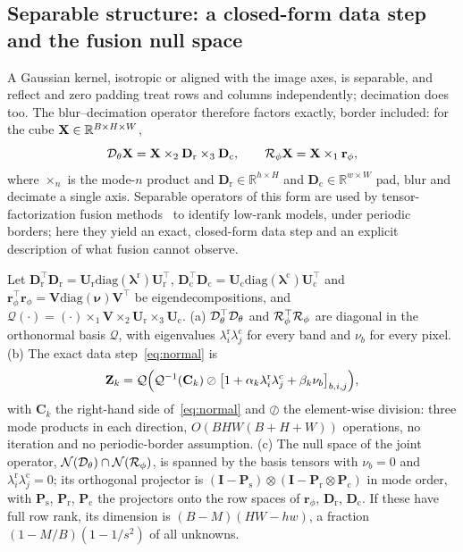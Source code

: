 \documentclass[journal]{IEEEtran}
\begin{document}
\subsection{Separable structure: a closed-form data step and the fusion null space}
\label{sec:kron}
A Gaussian kernel, isotropic or aligned with the image axes, is separable, and reflect and zero padding treat rows and columns independently; decimation does too. The blur--decimation operator therefore factors exactly, border included: for the cube $\mathbf{X}\in\mathbb{R}^{B\times H\times W}$,
\begin{equation}
\mathcal{D}_\theta\mathbf{X}=\mathbf{X}\times_2\mathbf{D}_{\mathrm{r}}\times_3\mathbf{D}_{\mathrm{c}},\qquad \mathcal{R}_\phi\mathbf{X}=\mathbf{X}\times_1\mathbf{r}_\phi,
\label{eq:modes}
\end{equation}
where $\times_n$ is the mode-$n$ product and $\mathbf{D}_{\mathrm{r}}\in\mathbb{R}^{h\times H}$ and $\mathbf{D}_{\mathrm{c}}\in\mathbb{R}^{w\times W}$ pad, blur and decimate a single axis. Separable operators of this form are used by tensor-factorization fusion methods~\cite{kanatsoulis2018stereo} to identify low-rank models, under periodic borders; here they yield an exact, closed-form data step and an explicit description of what fusion cannot observe.
\begin{theorem}
\label{thm:kron}
Let $\mathbf{D}_{\mathrm{r}}^{\top}\mathbf{D}_{\mathrm{r}}=\mathbf{U}_{\mathrm{r}}\mathrm{diag}(\boldsymbol{\lambda}^{\mathrm{r}})\mathbf{U}_{\mathrm{r}}^{\top}$, $\mathbf{D}_{\mathrm{c}}^{\top}\mathbf{D}_{\mathrm{c}}=\mathbf{U}_{\mathrm{c}}\mathrm{diag}(\boldsymbol{\lambda}^{\mathrm{c}})\mathbf{U}_{\mathrm{c}}^{\top}$ and $\mathbf{r}_\phi^{\top}\mathbf{r}_\phi=\mathbf{V}\mathrm{diag}(\boldsymbol{\nu})\mathbf{V}^{\top}$ be eigendecompositions, and $\mathcal{Q}(\cdot)=(\cdot)\times_1\mathbf{V}\times_2\mathbf{U}_{\mathrm{r}}\times_3\mathbf{U}_{\mathrm{c}}$. (a) $\mathcal{D}_\theta^{\top}\mathcal{D}_\theta$ and $\mathcal{R}_\phi^{\top}\mathcal{R}_\phi$ are diagonal in the orthonormal basis $\mathcal{Q}$, with eigenvalues $\lambda^{\mathrm{r}}_i\lambda^{\mathrm{c}}_j$ for every band and $\nu_b$ for every pixel. (b) The exact data step~\eqref{eq:normal} is
\begin{equation}
\mathbf{Z}_k=\mathcal{Q}\Big(\mathcal{Q}^{-1}(\mathbf{C}_k)\oslash\big[1+\alpha_k\lambda^{\mathrm{r}}_i\lambda^{\mathrm{c}}_j+\beta_k\nu_b\big]_{b,i,j}\Big),
\label{eq:kronstep}
\end{equation}
with $\mathbf{C}_k$ the right-hand side of~\eqref{eq:normal} and $\oslash$ the element-wise division: three mode products in each direction, $O(BHW(B+H+W))$ operations, no iteration and no periodic-border assumption. (c) The null space of the joint operator, $\mathcal{N}(\mathcal{D}_\theta)\cap\mathcal{N}(\mathcal{R}_\phi)$, is spanned by the basis tensors with $\nu_b=0$ and $\lambda^{\mathrm{r}}_i\lambda^{\mathrm{c}}_j=0$; its orthogonal projector is $(\mathbf{I}-\mathbf{P}_{\mathrm{s}})\otimes(\mathbf{I}-\mathbf{P}_{\mathrm{r}}\otimes\mathbf{P}_{\mathrm{c}})$ in mode order, with $\mathbf{P}_{\mathrm{s}}$, $\mathbf{P}_{\mathrm{r}}$, $\mathbf{P}_{\mathrm{c}}$ the projectors onto the row spaces of $\mathbf{r}_\phi$, $\mathbf{D}_{\mathrm{r}}$, $\mathbf{D}_{\mathrm{c}}$. If these have full row rank, its dimension is $(B-M)(HW-hw)$, a fraction $(1-M/B)(1-1/s^2)$ of all unknowns.
\end{theorem}
\end{document}
